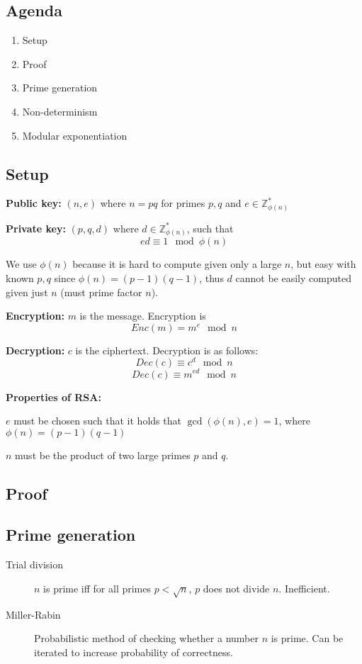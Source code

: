 

\subsection*{Agenda}
\begin{enumerate}
\item Setup
\item Proof
\item Prime generation
\item Non-determinism
\item Modular exponentiation
\end{enumerate}

\subsection{Setup}
\textbf{Public key:} $(n, e)$ where $n = pq$ for primes $p, q$ and $e \in \mathbb{Z}_{\phi(n)}^*$

\textbf{Private key:} $(p, q, d)$ where $d \in \mathbb{Z}_{\phi(n)}^*$, such that
\[ ed \equiv 1 \mod \phi(n) \]

We use $\phi(n)$ because it is hard to compute given only a large $n$, but easy with known $p, q$ since $\phi(n) = (p-1)(q-1)$, thus $d$ cannot be easily computed given just $n$ (must prime factor $n$).

\textbf{Encryption:} $m$ is the message. Encryption is
\[ Enc(m) = m^e \mod n \]

\textbf{Decryption:} $c$ is the ciphertext. Decryption is as follows:
\[ Dec(c) \equiv c^d \mod n \]
\[ Dec(c) \equiv m^{ed} \mod n \]

\textbf{Properties of RSA:}

$e$ must be chosen such that it holds that $\gcd(\phi(n),e) = 1$, where
$\phi(n) = (p - 1)(q - 1)$

$n$ must be the product of two large primes $p$ and $q$.

\subsection{Proof}


\subsection{Prime generation}
\begin{description}
\item[Trial division] $n$ is prime iff for all primes $p < \sqrt{n}$,
  $p$ does not divide $n$. Inefficient.
\item[Miller-Rabin] Probabilistic method of checking whether a number
  $n$ is prime. Can be iterated to increase probability of correctness.
\end{description}

